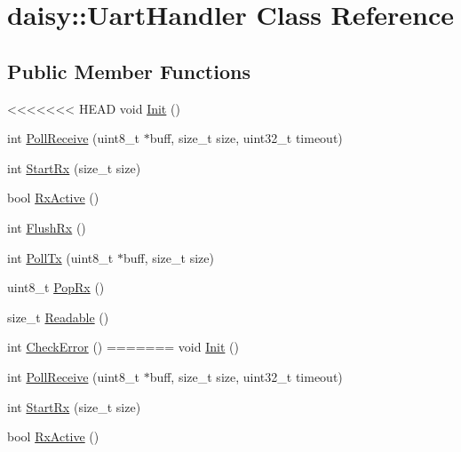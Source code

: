 \hypertarget{classdaisy_1_1_uart_handler}{}\section{daisy\+:\+:Uart\+Handler Class Reference}
\label{classdaisy_1_1_uart_handler}
\subsection*{Public Member Functions}
\begin{DoxyCompactItemize}
\item 
<<<<<<< HEAD
void \hyperlink{classdaisy_1_1_uart_handler_abe1b41b60b230b27b0a62d2a0c1c0f67}{Init} ()
\item 
int \hyperlink{classdaisy_1_1_uart_handler_a9641f3808cf70559d3d988f5ae8e254c}{Poll\+Receive} (uint8\+\_\+t $\ast$buff, size\+\_\+t size, uint32\+\_\+t timeout)
\item 
int \hyperlink{classdaisy_1_1_uart_handler_aad056734542e930d281412eca2faeeb2}{Start\+Rx} (size\+\_\+t size)
\item 
bool \hyperlink{classdaisy_1_1_uart_handler_aeeb804c58c2ccf574142b2a030d2d83b}{Rx\+Active} ()
\item 
int \hyperlink{classdaisy_1_1_uart_handler_aa7c66d512b976542a71d10666c415aa3}{Flush\+Rx} ()
\item 
int \hyperlink{classdaisy_1_1_uart_handler_a9c0739a29ccf7506a86e7ac9953e0a6f}{Poll\+Tx} (uint8\+\_\+t $\ast$buff, size\+\_\+t size)
\item 
uint8\+\_\+t \hyperlink{classdaisy_1_1_uart_handler_ae28345bdf7d66aa891bbde3cf8c68057}{Pop\+Rx} ()
\item 
size\+\_\+t \hyperlink{classdaisy_1_1_uart_handler_a4b8cad10b4f9a9520d2248c567babcc1}{Readable} ()
\item 
int \hyperlink{classdaisy_1_1_uart_handler_ada2266b23e77dde305b229b7814604fe}{Check\+Error} ()
=======
void \hyperlink{classdaisy_1_1_uart_handler_a7856843dd69d064a29ca437898fc00c4}{Init} ()
\item 
int \hyperlink{classdaisy_1_1_uart_handler_a7dd43d5317cc970d3475be9dcc1b1279}{Poll\+Receive} (uint8\+\_\+t $\ast$buff, size\+\_\+t size, uint32\+\_\+t timeout)
\item 
int \hyperlink{classdaisy_1_1_uart_handler_a7980159e256d1249abf95123ab66e398}{Start\+Rx} (size\+\_\+t size)
\item 
bool \hyperlink{classdaisy_1_1_uart_handler_ae3bc8ad69e1461ac2e20ac0c21e33c6a}{Rx\+Active} ()

\end{DoxyCompactItemize}
